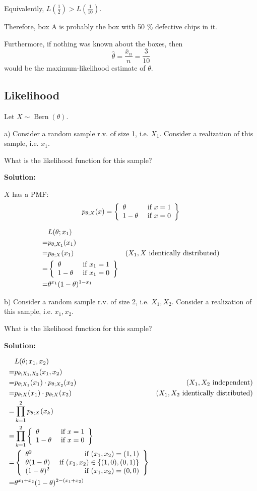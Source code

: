 \documentclass{article}
\begin{document}
Equivalently, \(L(\frac{1}{2}) > L(\frac{1}{10})\).

Therefore, box A is probably the box with 50 \% defective chips in it.

Furthermore, if nothing was known about the boxes, then
\[\hat{\theta} = \frac{\bar{x}_n}{n} = \frac{3}{10}\]
would be the maximum-likelihood estimate of \(\theta\).

\subsection{Likelihood}

Let \(X\sim \operatorname{Bern}(\theta)\).

a)
Consider a random sample r.v. of size 1, i.e. \(X_1\).
Consider a realization of this sample, i.e. \(x_1\).

What is the likelihood function for this sample?

\textbf{Solution:}

\(X\) has a PMF:
\[p_{\theta;X}(x) = \left\{\begin{array}{lr}\theta & \text{ if }x=1\\1-\theta & \text{ if }x=0\end{array}\right\}\]

\begin{align*}
     & L(\theta;x_1) \\
    =& p_{\theta;X_1}(x_1) \\
    =& p_{\theta;X}(x_1) & (X_1,X\text{ identically distributed}) \\
    =& \left\{\begin{array}{lr}\theta & \text{ if }x_1=1\\1-\theta & \text{ if }x_1=0\end{array}\right\} \\
    =& \theta^{x_1}(1-\theta)^{1-x_1}
\end{align*}

b)
Consider a random sample r.v. of size 2, i.e. \(X_1, X_2\).
Consider a realization of this sample, i.e. \(x_1, x_2\).

What is the likelihood function for this sample?

\textbf{Solution:}

\begin{align*}
     & L(\theta;x_1,x_2) \\
    =& p_{\theta;X_1,X_2}(x_1,x_2) \\
    =& p_{\theta;X_1}(x_1)\cdot p_{\theta;X_2}(x_2) & (X_1,X_2\text{ independent}) \\
    =& p_{\theta;X}(x_1)\cdot p_{\theta;X}(x_2) & (X_1,X_2\text{ identically distributed}) \\
    =& \prod_{k=1}^2 p_{\theta;X}(x_k) \\
    =& \prod_{k=1}^2 \left\{\begin{array}{lr}\theta & \text{ if }x=1\\1-\theta & \text{ if }x=0\end{array}\right\} \\
    =& \left\{\begin{array}{lr}\theta^2 & \text{ if }(x_1,x_2)=(1,1)\\ \theta(1-\theta) & \text{ if }(x_1,x_2)\in\{(1,0),(0,1)\} \\(1-\theta)^2 & \text{ if }(x_1,x_2)=(0,0)\end{array}\right\} \\
    =& \theta^{x_1+x_2}(1-\theta)^{2-(x_1+x_2)}
\end{align*}
\end{document}
